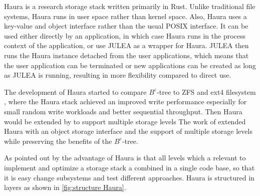 \documentclass[
	12pt,
	a4paper,
	abstract,
	bibliography=totoc,
	chapterprefix,
	headings=openright,
	numbers=endperiod,
	parskip=half,
	twoside,
]{scrreprt}
\begin{document}
Haura is a research storage stack written primarily in Rust.
Unlike traditional file systems, Haura runs in user space rather than kernel space.
Also, Haura uses a key-value and object interface rather than the usual POSIX interface.
It can be used either directly by an application, in which case Haura runs in the process context of the application, or
use JULEA as a wrapper for Haura.
JULEA then runs the Haura instance detached from the user applications, which means that the user application can be terminated or new applications can be created as long as JULEA is running, resulting in more flexibility compared to direct use.


The development of Haura started to compare $B^{\varepsilon}$-tree to ZFS and ext4 filesystem \cite{wiedemann2018modern}, where the Haura stack
achieved an improved write performance especially for small random write workloads and better sequential throughput.
Then Haura would be extended by \cite{hoppner2021design} to support multiple storage levels
The work of \cite{hoppner2021design} extended Haura with an object storage interface and the support of multiple storage levels while preserving the benefits of the $B^{\varepsilon}$-tree.

As pointed out by \cite{wunsche2022data} the advantage of Haura is that all levels which a relevant to implement and optimize a storage stack a combined in a single code base, so that it is easy change subsystems and test different approaches.
Haura is structured in layers as shown in \cref{fig:structure Haura}.
\end{document}
